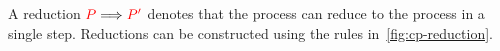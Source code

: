 \begin{definition}\label{def:cp-reduction}
  A reduction $\textcolor{red}{P}\Longrightarrow\textcolor{red}{P'}$ denotes that the process  can reduce to
  the process  in a single step. Reductions can be constructed using the
  rules in~\cref{fig:cp-reduction}.
\end{definition}
